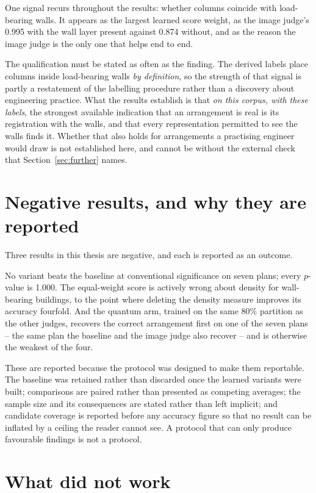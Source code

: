 One signal recurs throughout the results: whether columns coincide with
load-bearing walls. It appears as the largest learned score weight, as the
image judge's 0.995 with the wall layer present against 0.874 without, and
as the reason the image judge is the only one that helps end to end.

The qualification must be stated as often as the finding. The derived
labels place columns inside load-bearing walls \emph{by definition}, so the
strength of that signal is partly a restatement of the labelling
procedure rather than a discovery about engineering practice. What the
results establish is that \emph{on this corpus, with these labels}, the
strongest available indication that an arrangement is real is its
registration with the walls, and that every representation permitted to see
the walls finds it. Whether that also holds for arrangements a practising
engineer would draw is not established here, and cannot be without the
external check that Section~\ref{sec:further} names.

\section{Negative results, and why they are reported}

Three results in this thesis are negative, and each is reported as an
outcome.

No variant beats the baseline at conventional significance on seven plans;
every $p$-value is 1.000. The equal-weight score is actively wrong about
density for wall-bearing buildings, to the point where deleting the
density measure improves its accuracy fourfold. And the quantum arm,
trained on the same 80\% partition as the other judges, recovers the
correct arrangement first on one of the seven plans -- the same plan the
baseline and the image judge also recover -- and is otherwise the weakest
of the four.

These are reported because the protocol was designed to make them
reportable. The baseline was retained rather than discarded once the
learned variants were built; comparisons are paired rather than presented
as competing averages; the sample size and its consequences are stated
rather than left implicit; and candidate coverage is reported before any
accuracy figure so that no result can be inflated by a ceiling the reader
cannot see. A protocol that can only produce favourable findings is not a
protocol.

\section{What did not work}

